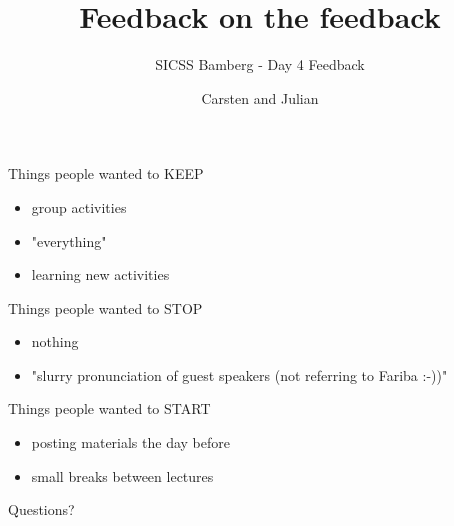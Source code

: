 \documentclass{beamer}
\title{Feedback on the feedback}
\subtitle{SICSS Bamberg - Day 4 Feedback}
\author{Carsten and Julian}
\institute{}
\date{}
\begin{document}
	\maketitle
	
	
	
	
	\begin{frame}
	
	Things people wanted to KEEP
	
	\begin{itemize}
		\item group activities
		\item "everything"
		\item learning new activities
	\end{itemize}
	
\end{frame}

\begin{frame}
Things people wanted to STOP

\begin{itemize}
	\item nothing
	\item "slurry pronunciation of guest speakers (not referring to Fariba :-))"
\end{itemize}

\end{frame}
\begin{frame}
Things people wanted to START

\begin{itemize}
\item posting materials the day before
\item small breaks between lectures

\end{itemize}

\end{frame}


\begin{frame}[standout]

\begin{center}
\LARGE
Questions?
\end{center}

\end{frame}
\end{document}
